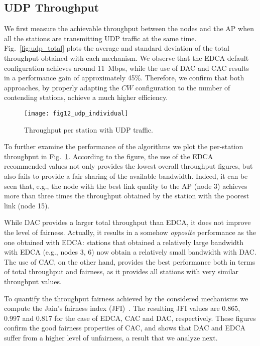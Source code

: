 \documentclass[a4paper,10pt]{article}
\begin{document}
\subsection{UDP Throughput}

We first measure the achievable throughput between the nodes and the AP when all the stations are transmitting UDP traffic at the same time. Fig.~\ref{fig:udp_total} plots the average and standard deviation of the total throughput obtained with each mechanism. We observe that the EDCA default configuration achieves around 11~Mbps, while the use of DAC and CAC results in a performance gain of approximately 45\%. Therefore, we confirm that both approaches, by properly adapting the $CW$ configuration to the number of contending stations, achieve a much higher efficiency. 

\begin{figure}[t]\texttt{[image: fig12\_udp\_individual]}\caption{Throughput per station with UDP traffic.\vspace{-0.5em}}\label{fig:udp_throughput_stations}\end{figure}

To further examine the performance of the algorithms we plot the per-station throughput in Fig.~\ref{fig:udp_throughput_stations}. According to the figure, the use of the EDCA recommended values not only provides the lowest overall throughput figures, but also fails to provide a fair sharing of the available bandwidth. Indeed, it can be seen that, e.g., the node with the best link quality to the AP (node 3) achieves more than three times the throughput obtained by the station with the poorest link (node 15).

While DAC provides a larger total throughput than EDCA, it does not improve the level of fairness. Actually, it results in a somehow \emph{opposite} performance as the one obtained with EDCA: stations that obtained a relatively large bandwidth with EDCA (e.g., nodes 3, 6) now obtain a relatively small bandwidth with DAC. The use of CAC, on the other hand, provides the best performance both in terms of total throughput and fairness, as it provides all stations with very similar throughput values. 

To quantify the throughput fairness achieved by the considered mechanisms we compute the Jain's fairness index (JFI)~\cite{jain84}. The resulting JFI values are 0.865, 0.997 and 0.817 for the case of EDCA, CAC and DAC, respectively. These figures confirm the good fairness properties of CAC, and shows that DAC and EDCA suffer from a higher level of unfairness, a result that we analyze next. 
\end{document}
